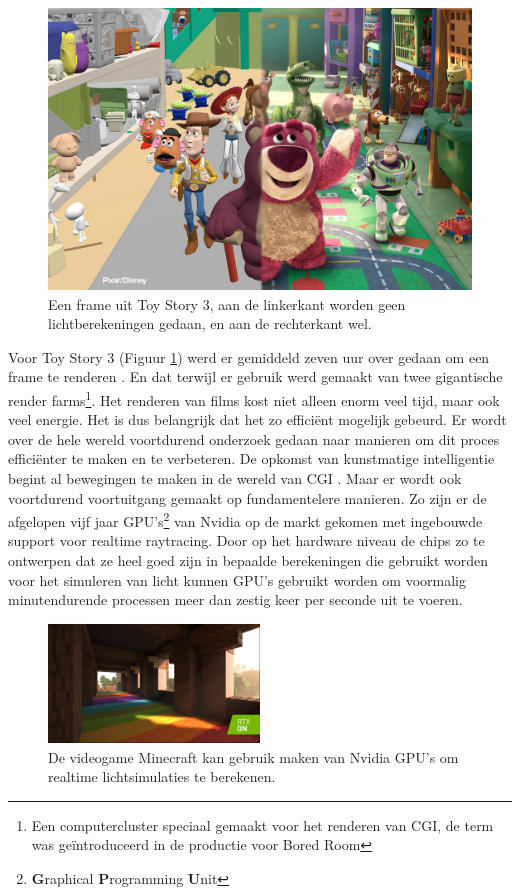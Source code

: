 \documentclass[12pt, a4paper]{article}
\begin{document}
\paragraph{}
\begin{figure}
    \includegraphics[width=1\linewidth]{toystory3comparison.jpg}
    \caption{Een frame uit Toy Story 3, aan de linkerkant worden geen lichtberekeningen gedaan, en aan de rechterkant wel.}
    \label{fig:toystory3}
\end{figure}
Voor Toy Story 3 (Figuur \ref{fig:toystory3}) werd er gemiddeld zeven uur over gedaan om een frame te renderen \cite{HowToyStory3WasMade}. En dat terwijl er gebruik werd gemaakt van twee gigantische render farms\footnote{Een computercluster speciaal gemaakt voor het renderen van CGI, de term was geïntroduceerd in de productie voor Bored Room\cite{MakingOfBoredRoom}}. Het renderen van films kost niet alleen enorm veel tijd, maar ook veel energie. Het is dus belangrijk dat het zo efficiënt mogelijk gebeurd. Er wordt over de hele wereld voortdurend onderzoek gedaan naar manieren om dit proces efficiënter te maken en te verbeteren. De opkomst van kunstmatige intelligentie begint al bewegingen te maken in de wereld van CGI \cite{NeRFactor}. Maar er wordt ook voortdurend voortuitgang gemaakt op fundamentelere manieren. Zo zijn er de afgelopen vijf jaar GPU's\footnote{\textbf{G}raphical \textbf{P}rogramming \textbf{U}nit} van Nvidia op de markt gekomen met ingebouwde support voor realtime raytracing\cite{NvidiaRTX}. Door op het hardware niveau de chips zo te ontwerpen dat ze heel goed zijn in bepaalde berekeningen die gebruikt worden voor het simuleren van licht kunnen GPU's gebruikt worden om voormalig minutendurende processen meer dan zestig keer per seconde uit te voeren. 
\begin{figure}[h]
    \centering
    \includegraphics[width=0.5\textwidth]{minecraftrtx.jpg}
    \caption{De videogame Minecraft kan gebruik maken van Nvidia GPU's om realtime lichtsimulaties te berekenen.}
    \label{fig:minecraftrtx}
\end{figure}
\end{document}

